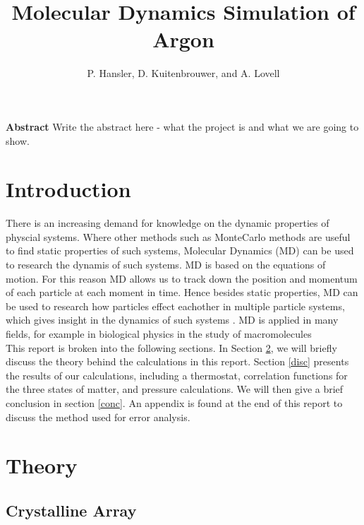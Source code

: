 \documentclass{article}
\begin{document}
\title{Molecular Dynamics Simulation of Argon}
\author{P. Hansler, D. Kuitenbrouwer, and A. Lovell}
\maketitle

\begin{center}
\textbf{Abstract}  Write the abstract here - what the project is and what we are going to show.  \\
\end{center}

\begin{multicols}{2}

\section{Introduction}

There is an increasing demand for knowledge on the dynamic properties of physcial systems. Where other methods such as MonteCarlo methods are useful to find static properties of such systems, Molecular Dynamics (MD) can be used to research the dynamis of such systems. MD is based on the equations of motion. For this reason MD allows us to track down the position and momentum of each particle at each moment in time. Hence besides static properties, MD can be used to research how particles effect eachother in multiple particle systems, which gives insight in the dynamics of such systems \cite{thijssen}. MD is applied in many fields, for example in biological physics in the study of macromolecules \cite{deGroot} \\

This report is broken into the following sections.  In Section \ref{theory}, we will briefly discuss the theory behind the calculations in this report.  Section \ref{disc} presents the results of our calculations, including a thermostat, correlation functions for the three states of matter, and pressure calculations.  We will then give a brief conclusion in section \ref{conc}.  An appendix is found at the end of this report to discuss the method used for error analysis.  

\section{Theory}
\label{theory}

\subsection{Crystalline Array}


\end{multicols}
\end{document}
